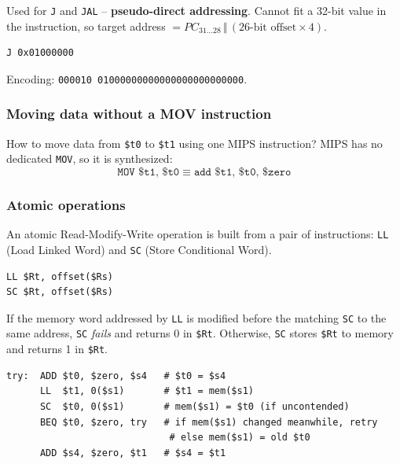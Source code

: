 Used for \texttt{J} and \texttt{JAL} -- \textbf{pseudo-direct addressing}.
Cannot fit a 32-bit value in the instruction, so target address $=
PC_{31\ldots28} \,\Vert\, (\text{26-bit offset} \times 4)$.
\begin{eg}[Jump]
\leavevmode
\begin{lstlisting}
J 0x01000000
\end{lstlisting}
Encoding: \texttt{000010 01000000000000000000000000}.
\end{eg}

\subsubsection{Moving data without a MOV instruction}

\begin{eg}
How to move data from \texttt{\$t0} to \texttt{\$t1} using one MIPS
instruction? MIPS has no dedicated \texttt{MOV}, so it is synthesized:
\[
  \texttt{MOV \$t1, \$t0} \;\equiv\; \texttt{add \$t1, \$t0, \$zero}
\]
\end{eg}

\subsubsection{Atomic operations}

\begin{definition}
An atomic Read-Modify-Write operation is built from a pair of instructions:
\texttt{LL} (Load Linked Word) and \texttt{SC} (Store Conditional Word).
\begin{lstlisting}
LL $Rt, offset($Rs)
SC $Rt, offset($Rs)
\end{lstlisting}
If the memory word addressed by \texttt{LL} is modified before the matching
\texttt{SC} to the same address, \texttt{SC} \emph{fails} and returns 0 in
\texttt{\$Rt}. Otherwise, \texttt{SC} stores \texttt{\$Rt} to memory and
returns 1 in \texttt{\$Rt}.
\end{definition}

\begin{eg}
\leavevmode
\begin{lstlisting}
try:  ADD $t0, $zero, $s4   # $t0 = $s4
      LL  $t1, 0($s1)       # $t1 = mem($s1)
      SC  $t0, 0($s1)       # mem($s1) = $t0 (if uncontended)
      BEQ $t0, $zero, try   # if mem($s1) changed meanwhile, retry
                             # else mem($s1) = old $t0
      ADD $s4, $zero, $t1   # $s4 = $t1
\end{lstlisting}
\end{eg}

